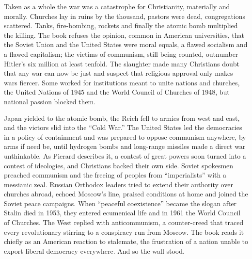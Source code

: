 Taken as a whole the war was a catastrophe for Christianity, materially and morally. Churches lay in
ruins by the thousand, pastors were dead, congregations scattered. Tanks, fire-bombing, rockets and
finally the atomic bomb multiplied the killing. The book refuses the opinion, common in American
universities, that the Soviet Union and the United States were moral equals, a flawed socialism and a
flawed capitalism; the victims of communism, still being counted, outnumber Hitler's six million at
least tenfold. The slaughter made many Christians doubt that any war can now be just and suspect that
religious approval only makes wars fiercer. Some worked for institutions meant to unite nations and
churches, the United Nations of 1945 and the World Council of Churches of 1948, but national passion
blocked them.

Japan yielded to the atomic bomb, the Reich fell to armies from west and east, and the victors
slid into the ``Cold War.'' The United States led the democracies in a policy of containment and was
prepared to oppose communism anywhere, by arms if need be, until hydrogen bombs and long-range
missiles made a direct war unthinkable. As Pierard describes it, a contest of great powers soon
turned into a contest of ideologies, and Christians backed their own side. Soviet spokesmen preached
communism and the freeing of peoples from ``imperialists'' with a messianic zeal. Russian Orthodox
leaders tried to extend their authority over churches abroad, echoed Moscow's line, praised
conditions at home and joined the Soviet peace campaigns. When ``peaceful coexistence'' became the
slogan after Stalin died in 1953, they entered ecumenical life and in 1961 the World Council of
Churches. The West replied with anticommunism, a counter-creed that traced every revolutionary
stirring to a conspiracy run from Moscow. The book reads it chiefly as an American reaction to
stalemate, the frustration of a nation unable to export liberal democracy everywhere. And so the wall
stood.

\begin{keyfacts}
\end{keyfacts}
